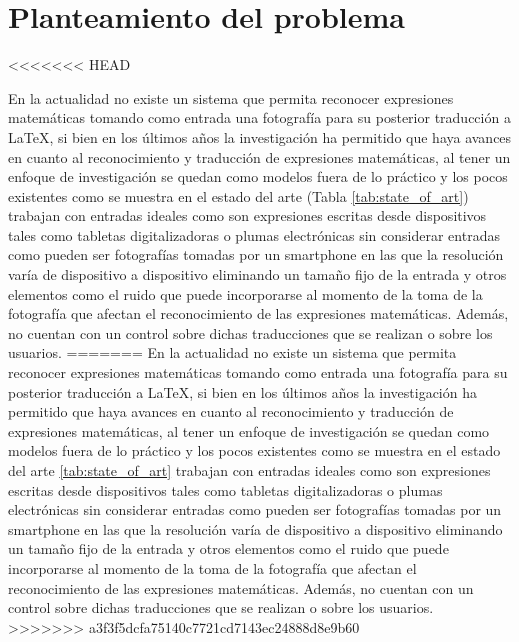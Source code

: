 \newpage
\section{Planteamiento del problema}
<<<<<<< HEAD

En la actualidad no existe un sistema que permita reconocer expresiones matemáticas tomando como entrada una fotografía para su posterior traducción a \LaTeX, si bien en los últimos años la investigación ha permitido que haya avances en cuanto al reconocimiento y traducción de expresiones matemáticas, al tener un enfoque de investigación se quedan como modelos fuera de lo práctico y los pocos existentes como se muestra en el estado del arte (Tabla \ref{tab:state_of_art}) trabajan con entradas ideales como son expresiones escritas desde dispositivos tales como tabletas digitalizadoras o plumas electrónicas sin considerar entradas como pueden ser fotografías tomadas por un smartphone en las que la resolución varía de dispositivo a dispositivo eliminando un tamaño fijo de la entrada y otros elementos como el ruido que puede incorporarse al momento de la toma de la fotografía que afectan el reconocimiento de las expresiones matemáticas. Además, no cuentan con un control sobre dichas traducciones que se realizan o sobre los usuarios.
=======
En la actualidad no existe un sistema que permita reconocer expresiones matemáticas tomando como entrada una fotografía para su posterior traducción a \LaTeX{}, si bien en los últimos años la investigación ha permitido que haya avances en cuanto al reconocimiento y traducción de expresiones matemáticas, al tener un enfoque de investigación se quedan como modelos fuera de lo práctico y los pocos existentes como se muestra en el estado del arte \ref{tab:state_of_art} trabajan con entradas ideales como son expresiones escritas desde dispositivos tales como tabletas digitalizadoras o plumas electrónicas sin considerar entradas como pueden ser fotografías tomadas por un smartphone en las que la resolución varía de dispositivo a dispositivo eliminando un tamaño fijo de la entrada y otros elementos como el ruido que puede incorporarse al momento de la toma de la fotografía que afectan el reconocimiento de las expresiones matemáticas. Además, no cuentan con un control sobre dichas traducciones que se realizan o sobre los usuarios.
>>>>>>> a3f3f5dcfa75140c7721cd7143ec24888d8e9b60
\\\\


